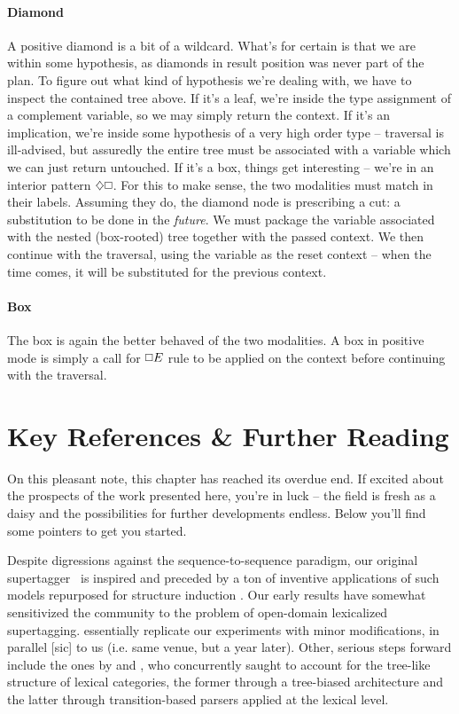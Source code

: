 \paragraph{Diamond}
A positive diamond is a bit of a wildcard.
What's for certain is that we are within some hypothesis, as diamonds in result position was never part of the plan.
To figure out what kind of hypothesis we're dealing with, we have to inspect the contained tree above.
If it's a leaf, we're inside the type assignment of a complement variable, so we may simply return the context.
If it's an implication, we're inside some hypothesis of a very high order type -- traversal is ill-advised, but assuredly the entire tree must be associated with a variable which we can just return untouched.
If it's a box, things get interesting -- we're in an interior pattern $\diamond\bx$.
For this to make sense, the two modalities must match in their labels.
Assuming they do, the diamond node is prescribing a cut: a substitution to be done in the \textit{future}.
We must package the variable associated with the nested (box-rooted) tree together with the passed context.
We then continue with the traversal, using the variable as the reset context -- when the time comes, it will be substituted for the previous context.

\paragraph{Box}
The box is again the better behaved of the two modalities.
A box in positive mode is simply a call for $\bx E$ rule to be applied on the context before continuing with the traversal.

\section{Key References \& Further Reading}
On this pleasant note, this chapter has reached its overdue end.
If excited about the prospects of the work presented here, you're in luck -- the field is fresh as a daisy and the possibilities for further developments endless.
Below you'll find some pointers to get you started.

Despite digressions against the sequence-to-sequence paradigm, our original supertagger~\cite{kogkalidis-etal-2019-constructive} is inspired and preceded by a ton of inventive applications of such models repurposed for structure induction \cite[inter alia]{vinyals2015grammar,wiseman2016sequence,dong-lapata-2016-language,buys2017robust}.
Our early results have somewhat sensitivized the community to the problem of open-domain lexicalized supertagging.
\citet{bhargava2020supertagging} essentially replicate our experiments with minor modifications, in parallel [sic] to us (i.e. same venue, but a year later).
Other, serious steps forward include the ones by \citet{prange-etal-2021-supertagging} and \citet{Liu_Ji_Wu_Lan_2021}, who concurrently saught to account for the tree-like structure of lexical categories, the former through a tree-biased architecture and the latter through transition-based parsers applied at the lexical level.

